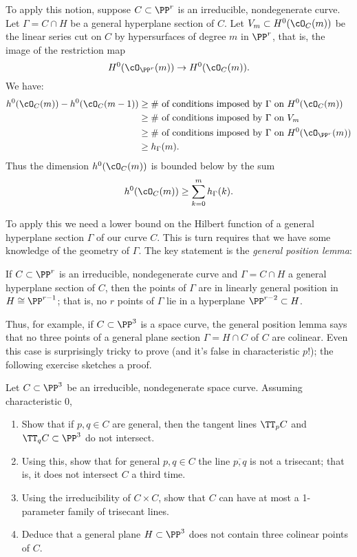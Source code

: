 To apply this notion, suppose $C \subset \PP^r$ is an irreducible, nondegenerate curve. Let $\Gamma = C \cap H$ be a general hyperplane section of $C$. Let $V_m \subset H^0(\cO_C(m))$ be the linear series cut on $C$ by hypersurfaces of degree $m$ in $\PP^r$, that is, the image of the restriction map
$$
H^0(\cO_{\PP^r}(m)) \to H^0(\cO_C(m)).
$$
We have:
\begin{align*}
h^0(\cO_C(m)) - h^0(\cO_C(m-1)) & \geq \text{\# of conditions imposed by $\Gamma$ on $H^0(\cO_C(m))$} \\
&\geq \text{\# of conditions imposed by $\Gamma$ on $V_m$} \\
&\geq \text{\# of conditions imposed by $\Gamma$ on $H^0(\cO_{\PP^r}(m))$} \\
&\geq h_\Gamma(m).
\end{align*}
Thus the dimension $h^0(\cO_C(m))$ is bounded below by the sum
$$
h^0(\cO_C(m)) \geq \sum_{k=0}^m h_\Gamma(k).
$$

To apply this we need a lower bound on the Hilbert function of a general hyperplane section $\Gamma$ of our curve $C$. This is turn requires that we have some knowledge of the geometry of $\Gamma$. The key statement is the \emph{general position lemma}:

\begin{lemma}\label{general position lemma}
If $C \subset \PP^r$ is an irreducible, nondegenerate curve and $\Gamma = C \cap H$ a general hyperplane section of $C$, then the points of $\Gamma$ are in linearly general position in $H \cong \PP^{r-1}$; that is, no $r$ points of $\Gamma$ lie in a hyperplane $\PP^{r-2} \subset H$.
\end{lemma}

Thus, for example, if $C \subset \PP^3$ is a space curve, the general position lemma says that no three points of a general plane section $\Gamma = H \cap C$ of $C$ are colinear. Even this case is surprisingly tricky to prove (and it's false in characteristic $p$!); the following exercise sketches a proof.

\begin{exercise}
Let $C \subset \PP^3$ be an irreducible, nondegenerate space curve. Assuming characteristic 0,
\begin{enumerate}
\item Show that if $p, q \in C$ are general, then the tangent lines $\TT_pC$ and $\TT_qC \subset \PP^3$ do not intersect.
\item Using this, show that for general $p, q \in C$ the line $\overline{p,q}$ is not a trisecant; that is, it does not intersect $C$ a third time.
\item Using the irreducibility of $C \times C$, show that $C$ can have at most a 1-parameter family of trisecant lines.
\item Deduce that a general plane $H \subset \PP^3$ does not contain three colinear points of $C$.
\end{enumerate}
\end{exercise}

